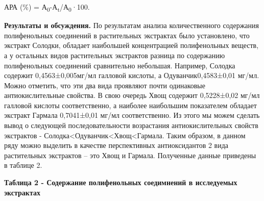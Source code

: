 АРА (\%) = А\textsubscript{0}-А\textsubscript{t}/А\textsubscript{0}·100.

{\bfseries Результаты и обсуждения.} По результатам анализа количественного
содержания полифенольных соединений в растительных экстрактах было
установлено, что экстракт Солодки, обладает наибольшей концентрацией
полифенольных веществ, а у остальных видов растительных экстрактов
разница по содержанию полифенольных соединений сравнительно небольшая.
Например, Солодка содержит 0,4563±0,005мг/мл галловой кислоты, а
Одуванчик0,4583±0,01 мг/мл. Можно отметить, что эти два вида проявляют
почти одинаковые антиокислительные свойства. В свою очередь Хвощ
содержит 0,5228±0,02 мг/мл галловой кислоты соответственно, а наиболее
наибольшим показателем обладает экстракт Гармала 0,7041±0,01 мг/мл
соответственно. Из этого мы можем сделать вывод о следующей
последовательности возрастания антиокислительных свойств экстрактов -
Солодка\textless Одуванчик\textless Хвощ\textless Гармала. Таким
образом, в данном ряду можно выделить в качестве перспективных
антиоксидантов 2 вида растительных экстрактов -- это Хвощ и Гармала.
Полученные данные приведены в таблице 2.

{\bfseries Таблица 2 - Содержание полифенольных соедимнений в исследуемых
экстрактах}


